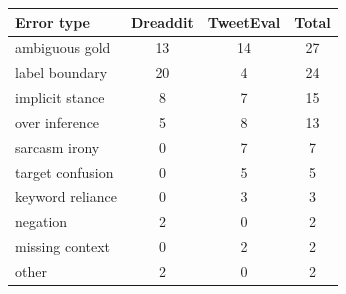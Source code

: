 \begin{tabular}{lccc}
\toprule
Error type & Dreaddit & TweetEval & Total \\
\midrule
ambiguous gold & 13 & 14 & 27 \\
label boundary & 20 & 4 & 24 \\
implicit stance & 8 & 7 & 15 \\
over inference & 5 & 8 & 13 \\
sarcasm irony & 0 & 7 & 7 \\
target confusion & 0 & 5 & 5 \\
keyword reliance & 0 & 3 & 3 \\
negation & 2 & 0 & 2 \\
missing context & 0 & 2 & 2 \\
other & 2 & 0 & 2 \\
\bottomrule
\end{tabular}
